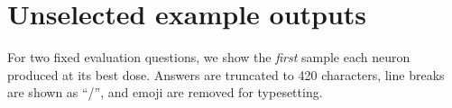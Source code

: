 \documentclass[11pt]{article}
\begin{document}
\section{Unselected example outputs}
\label{app:examples}

For two fixed evaluation questions, we show the \emph{first} sample each neuron produced at its best dose. Answers are truncated to 420 characters, line breaks are shown as ``/'', and emoji are removed for typesetting.

{\small

}
\end{document}
